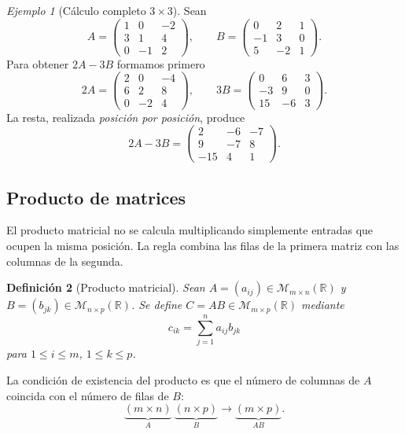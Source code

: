 \documentclass[12pt]{article}
\newtheorem{definicion}{Definición}[section]
\theoremstyle{remark}
\newtheorem{ejemplo}[definicion]{Ejemplo}
\newcommand{\R}{\mathbb{R}}
\newcommand{\Mat}[2]{\mathcal{M}_{#1\times #2}}
\begin{document}
\begin{ejemplo}[Cálculo completo $3\times3$]
Sean
\[
A=\begin{pmatrix}1&0&-2\\3&1&4\\0&-1&2\end{pmatrix},\qquad
B=\begin{pmatrix}0&2&1\\-1&3&0\\5&-2&1\end{pmatrix}.
\]
Para obtener $2A-3B$ formamos primero
\[
2A=\begin{pmatrix}2&0&-4\\6&2&8\\0&-2&4\end{pmatrix},\qquad
3B=\begin{pmatrix}0&6&3\\-3&9&0\\15&-6&3\end{pmatrix}.
\]
La resta, realizada \emph{posición por posición}, produce
\[
\boxed{2A-3B=\begin{pmatrix}2&-6&-7\\9&-7&8\\-15&4&1\end{pmatrix}.}
\]
\end{ejemplo}



\subsection{Producto de matrices}
El producto matricial no se calcula multiplicando simplemente entradas que ocupen la misma posición. La regla combina las filas de la primera matriz con las columnas de la segunda.

\begin{definicion}[Producto matricial]
Sean $A=(a_{ij})\in\Mat{m}{n}(\R)$ y $B=(b_{jk})\in\Mat{n}{p}(\R)$. Se define $C=AB\in\Mat{m}{p}(\R)$ mediante
\[
\boxed{\quad c_{ik}=\sum_{j=1}^{n}a_{ij}b_{jk}\quad}
\]
para $1\le i\le m$, $1\le k\le p$.
\end{definicion}

La condición de existencia del producto es que el número de columnas de $A$ coincida con el número de filas de $B$:
\[
\underbrace{(m\times n)}_A\ \underbrace{(n\times p)}_B
\longrightarrow\underbrace{(m\times p)}_{AB}.
\]
\end{document}

